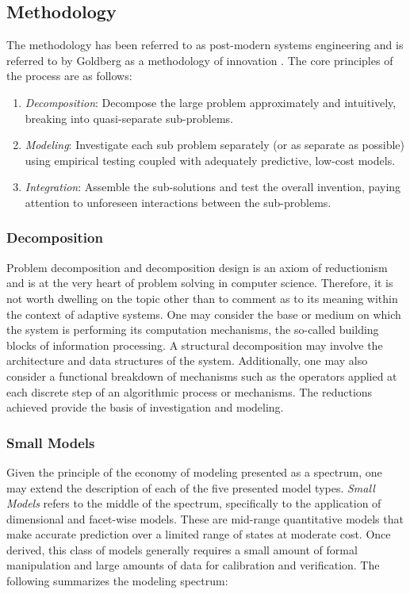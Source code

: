 \documentclass[a4paper, 11pt]{article}
\begin{document}
\subsection{Methodology}
The methodology has been referred to as post-modern systems engineering and is referred to by Goldberg as a methodology of innovation \cite{Goldberg2004}. The core principles of the process are as follows: 

\begin{enumerate}
	\item \emph{Decomposition}: Decompose the large problem approximately and intuitively, breaking into quasi-separate sub-problems.
	\item \emph{Modeling}: Investigate each sub problem separately (or as separate as possible) using empirical testing coupled with adequately predictive, low-cost models.
	\item \emph{Integration}: Assemble the sub-solutions and test the overall invention, paying attention to unforeseen interactions between the sub-problems.
\end{enumerate}

\subsubsection{Decomposition} 
Problem decomposition and decomposition design is an axiom of reductionism and is at the very heart of problem solving in computer science. Therefore, it is not worth dwelling on the topic other than to comment as to its meaning within the context of adaptive systems. One may consider the base or medium on which the system is performing its computation mechanisms, the so-called building blocks of information processing. A structural decomposition may involve the architecture and data structures of the system. Additionally, one may also consider a functional breakdown of mechanisms such as the operators applied at each discrete step of an algorithmic process or mechanisms. The reductions achieved provide the basis of investigation and modeling.

\subsubsection{Small Models} 
Given the principle of the economy of modeling presented as a spectrum, one may extend the description of each of the five presented model types. \emph{Small Models} refers to the middle of the spectrum, specifically to the application of dimensional and facet-wise models. These are mid-range quantitative models that make accurate prediction over a limited range of states at moderate cost. Once derived, this class of models generally requires a small amount of formal manipulation and large amounts of data for calibration and verification. The following summarizes the modeling spectrum:
\end{document}
